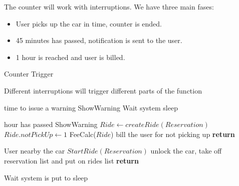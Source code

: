 \documentclass[a4paper]{article}
\begin{document}
The counter will work with interruptions. We have three main fases:
\begin{itemize} 
\item User picks up the car in time, counter is ended. 
\item 45 minutes has passed, notification is sent to the user.
\item 1 hour is reached and user is billed.
\end{itemize}

\begin{algorithm}[H]
\caption{Counter Trigger}\label{Counter}
\begin{algorithmic}[1]

\Comment Different interruptions will trigger different parts of the function

 \Comment time to issue a warning
	\State ShowWarning
	\State Wait \Comment system sleep
\EndIf


  hour has passed
	\State ShowWarning
	\State $Ride \leftarrow createRide(Reservation)$
	\State $Ride.notPickUp \leftarrow 1$ 
	\State FeeCalc($Ride$) \Comment bill the user for not picking up
	\State \textbf{return}
\EndIf

 \Comment User nearby the car
	\State $StartRide(Reservation)$ \Comment unlock the car, take off reservation list and put on rides list
	\State \textbf{return}
\EndIf
 
\State Wait \Comment system is put to sleep
\EndProcedure
\end{algorithmic}
\end{algorithm}
\end{document}
